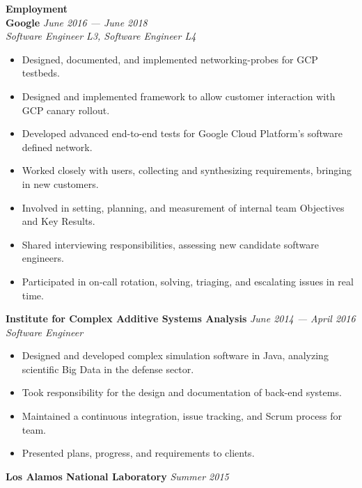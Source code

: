 \documentclass[11pt,a4paper,sans]{article}
\newcommand{\cvcolor}[1]{{\color{MidnightBlue}#1}}
\renewcommand{\section}[1]{
  \cvcolor{\noindent \textbf{\LARGE #1}}
  \vspace{.5em}\\
}
\begin{document}
\section{Employment}
\textbf{Google} \hfill \textsl{June 2016 --- June 2018}\\
\textsl{Software Engineer L3, Software Engineer L4}
\begin{itemize}
  \item Designed, documented, and implemented networking-probes for GCP testbeds.
  \item Designed and implemented framework to allow customer interaction with
    GCP canary rollout.
  \item Developed advanced end-to-end tests for Google Cloud Platform's software defined network.
  \item Worked closely with users, collecting and synthesizing requirements,
    bringing in new customers.
  \item Involved in setting, planning, and measurement of internal
    team Objectives and Key Results.
  \item Shared interviewing responsibilities, assessing new candidate software engineers.
  \item Participated in on-call rotation, solving, triaging, and escalating issues in real time.
\end{itemize}
\vspace{0.2em}
\textbf{Institute for Complex Additive Systems Analysis} \hfill \textsl{June 2014 --- April 2016}\\
\textsl{Software Engineer}
\begin{itemize}
  \item Designed and developed complex simulation software in Java, analyzing
    scientific Big Data in the defense sector.
  \item Took responsibility for the design and documentation of back-end
    systems.
  \item Maintained a continuous integration, issue tracking, and Scrum process
    for team.
  \item Presented plans, progress, and requirements to clients.
\end{itemize}
\vspace{0.2em}
\textbf{Los Alamos National Laboratory} \hfill \textsl{Summer 2015}\\
\end{document}
